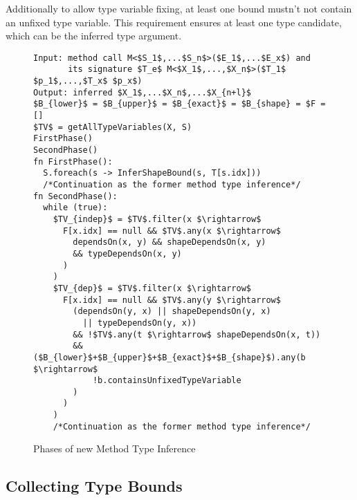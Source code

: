 Additionally to allow type variable fixing, at least one bound mustn't not contain an unfixed type variable. 
This requirement ensures at least one type candidate, which can be the inferred type argument.
\begin{figure}[h!]
\begin{lstlisting}[style=myAlgo, mathescape=true]
Input: method call M<$S_1$,...$S_n$>($E_1$,...$E_x$) and 
       its signature $T_e$ M<$X_1$,...,$X_n$>($T_1$ $p_1$,...,$T_x$ $p_x$)
Output: inferred $X_1$,...$X_n$,...$X_{n+l}$
$B_{lower}$ = $B_{upper}$ = $B_{exact}$ = $B_{shape} = $F = []
$TV$ = getAllTypeVariables(X, S)
FirstPhase()
SecondPhase()
fn FirstPhase():
  S.foreach(s -> InferShapeBound(s, T[s.idx]))
  /*Continuation as the former method type inference*/
fn SecondPhase():
  while (true):
    $TV_{indep}$ = $TV$.filter(x $\rightarrow$ 
      F[x.idx] == null && $TV$.any(x $\rightarrow$ 
        dependsOn(x, y) && shapeDependsOn(x, y) 
        && typeDependsOn(x, y)
      )
    )
    $TV_{dep}$ = $TV$.filter(x $\rightarrow$
      F[x.idx] == null && $TV$.any(y $\rightarrow$ 
        (dependsOn(y, x) || shapeDependsOn(y, x) 
          || typeDependsOn(y, x)) 
        && !$TV$.any(t $\rightarrow$ shapeDependsOn(x, t))
        && ($B_{lower}$+$B_{upper}$+$B_{exact}$+$B_{shape}$).any(b $\rightarrow$ 
            !b.containsUnfixedTypeVariable
        )
      )
    )
    /*Continuation as the former method type inference*/
\end{lstlisting}
\caption{Phases of new Method Type Inference}
\label{img54:mainTypeInference1}
\end{figure}

\newpage

\subsection{Collecting Type Bounds}


